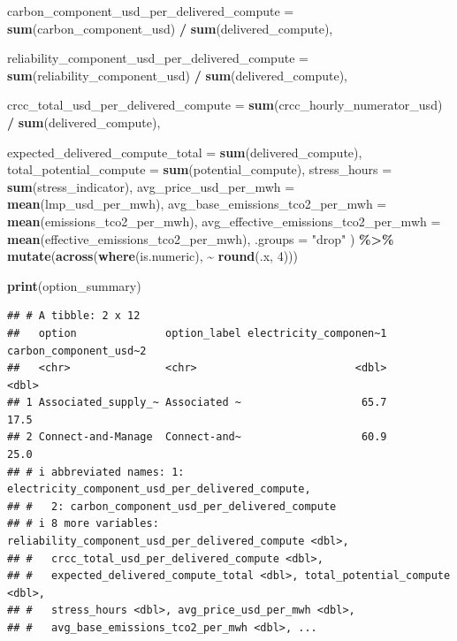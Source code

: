 \documentclass[
]{article}
\newenvironment{Shaded}{\begin{snugshade}}{\end{snugshade}}
\newcommand{\AttributeTok}[1]{\textcolor[rgb]{0.13,0.29,0.53}{#1}}
\newcommand{\DecValTok}[1]{\textcolor[rgb]{0.00,0.00,0.81}{#1}}
\newcommand{\FunctionTok}[1]{\textcolor[rgb]{0.13,0.29,0.53}{\textbf{#1}}}
\newcommand{\NormalTok}[1]{#1}
\newcommand{\SpecialCharTok}[1]{\textcolor[rgb]{0.81,0.36,0.00}{\textbf{#1}}}
\newcommand{\StringTok}[1]{\textcolor[rgb]{0.31,0.60,0.02}{#1}}
\begin{document}
\begin{Shaded}
\begin{Highlighting}[]
    \AttributeTok{carbon\_component\_usd\_per\_delivered\_compute =}
      \FunctionTok{sum}\NormalTok{(carbon\_component\_usd) }\SpecialCharTok{/} \FunctionTok{sum}\NormalTok{(delivered\_compute),}

    \AttributeTok{reliability\_component\_usd\_per\_delivered\_compute =}
      \FunctionTok{sum}\NormalTok{(reliability\_component\_usd) }\SpecialCharTok{/} \FunctionTok{sum}\NormalTok{(delivered\_compute),}

    \AttributeTok{crcc\_total\_usd\_per\_delivered\_compute =}
      \FunctionTok{sum}\NormalTok{(crcc\_hourly\_numerator\_usd) }\SpecialCharTok{/} \FunctionTok{sum}\NormalTok{(delivered\_compute),}

    \AttributeTok{expected\_delivered\_compute\_total =} \FunctionTok{sum}\NormalTok{(delivered\_compute),}
    \AttributeTok{total\_potential\_compute =} \FunctionTok{sum}\NormalTok{(potential\_compute),}
    \AttributeTok{stress\_hours =} \FunctionTok{sum}\NormalTok{(stress\_indicator),}
    \AttributeTok{avg\_price\_usd\_per\_mwh =} \FunctionTok{mean}\NormalTok{(lmp\_usd\_per\_mwh),}
    \AttributeTok{avg\_base\_emissions\_tco2\_per\_mwh =} \FunctionTok{mean}\NormalTok{(emissions\_tco2\_per\_mwh),}
    \AttributeTok{avg\_effective\_emissions\_tco2\_per\_mwh =} \FunctionTok{mean}\NormalTok{(effective\_emissions\_tco2\_per\_mwh),}
    \AttributeTok{.groups =} \StringTok{"drop"}
\NormalTok{  ) }\SpecialCharTok{\%\textgreater{}\%}
  \FunctionTok{mutate}\NormalTok{(}\FunctionTok{across}\NormalTok{(}\FunctionTok{where}\NormalTok{(is.numeric), }\SpecialCharTok{\textasciitilde{}} \FunctionTok{round}\NormalTok{(.x, }\DecValTok{4}\NormalTok{)))}

\FunctionTok{print}\NormalTok{(option\_summary)}
\end{Highlighting}
\end{Shaded}

\begin{verbatim}
## # A tibble: 2 x 12
##   option              option_label electricity_componen~1 carbon_component_usd~2
##   <chr>               <chr>                         <dbl>                  <dbl>
## 1 Associated_supply_~ Associated ~                   65.7                   17.5
## 2 Connect-and-Manage  Connect-and~                   60.9                   25.0
## # i abbreviated names: 1: electricity_component_usd_per_delivered_compute,
## #   2: carbon_component_usd_per_delivered_compute
## # i 8 more variables: reliability_component_usd_per_delivered_compute <dbl>,
## #   crcc_total_usd_per_delivered_compute <dbl>,
## #   expected_delivered_compute_total <dbl>, total_potential_compute <dbl>,
## #   stress_hours <dbl>, avg_price_usd_per_mwh <dbl>,
## #   avg_base_emissions_tco2_per_mwh <dbl>, ...
\end{verbatim}
\end{document}
